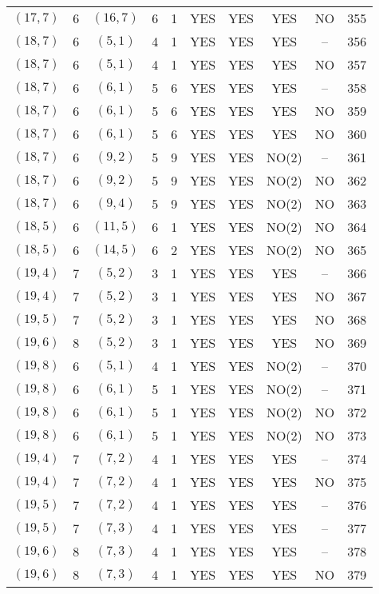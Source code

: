 \begin{longtable}{|c|c|c|c|c|c|c|c|c|c|}
$(17, 7)$ & 6 & $(16, 7)$ & 6 & 1 & YES & YES & YES & NO & 355\\
$(18, 7)$ & 6 & $(5, 1)$ & 4 & 1 & YES & YES & YES & -- & 356\\
$(18, 7)$ & 6 & $(5, 1)$ & 4 & 1 & YES & YES & YES & NO & 357\\
$(18, 7)$ & 6 & $(6, 1)$ & 5 & 6 & YES & YES & YES & -- & 358\\
$(18, 7)$ & 6 & $(6, 1)$ & 5 & 6 & YES & YES & YES & NO & 359\\
$(18, 7)$ & 6 & $(6, 1)$ & 5 & 6 & YES & YES & YES & NO & 360\\
$(18, 7)$ & 6 & $(9, 2)$ & 5 & 9 & YES & YES & NO(2) & -- & 361\\
$(18, 7)$ & 6 & $(9, 2)$ & 5 & 9 & YES & YES & NO(2) & NO & 362\\
$(18, 7)$ & 6 & $(9, 4)$ & 5 & 9 & YES & YES & NO(2) & NO & 363\\
$(18, 5)$ & 6 & $(11, 5)$ & 6 & 1 & YES & YES & NO(2) & NO & 364\\
$(18, 5)$ & 6 & $(14, 5)$ & 6 & 2 & YES & YES & NO(2) & NO & 365\\
$(19, 4)$ & 7 & $(5, 2)$ & 3 & 1 & YES & YES & YES & -- & 366\\
$(19, 4)$ & 7 & $(5, 2)$ & 3 & 1 & YES & YES & YES & NO & 367\\
$(19, 5)$ & 7 & $(5, 2)$ & 3 & 1 & YES & YES & YES & NO & 368\\
$(19, 6)$ & 8 & $(5, 2)$ & 3 & 1 & YES & YES & YES & NO & 369\\
$(19, 8)$ & 6 & $(5, 1)$ & 4 & 1 & YES & YES & NO(2) & -- & 370\\
$(19, 8)$ & 6 & $(6, 1)$ & 5 & 1 & YES & YES & NO(2) & -- & 371\\
$(19, 8)$ & 6 & $(6, 1)$ & 5 & 1 & YES & YES & NO(2) & NO & 372\\
$(19, 8)$ & 6 & $(6, 1)$ & 5 & 1 & YES & YES & NO(2) & NO & 373\\
$(19, 4)$ & 7 & $(7, 2)$ & 4 & 1 & YES & YES & YES & -- & 374\\
$(19, 4)$ & 7 & $(7, 2)$ & 4 & 1 & YES & YES & YES & NO & 375\\
$(19, 5)$ & 7 & $(7, 2)$ & 4 & 1 & YES & YES & YES & -- & 376\\
$(19, 5)$ & 7 & $(7, 3)$ & 4 & 1 & YES & YES & YES & -- & 377\\
$(19, 6)$ & 8 & $(7, 3)$ & 4 & 1 & YES & YES & YES & -- & 378\\
$(19, 6)$ & 8 & $(7, 3)$ & 4 & 1 & YES & YES & YES & NO & 379\\

\end{longtable}
